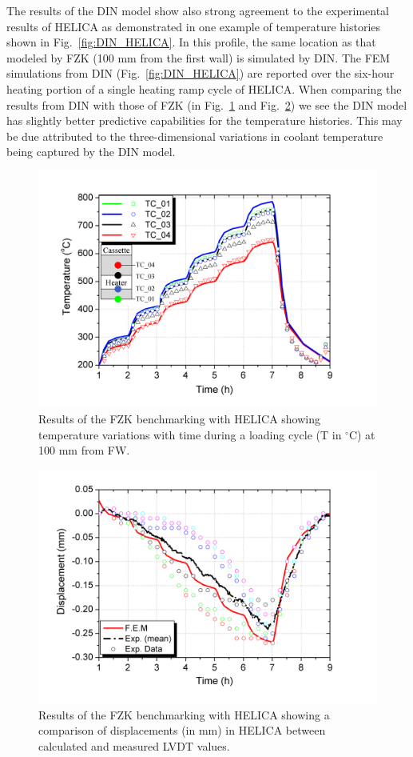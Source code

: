 The results of the DIN model show also strong agreement to the experimental results of HELICA as demonstrated in one example of temperature histories shown in Fig.~\ref{fig:DIN_HELICA}. In this profile, the same location as that modeled by FZK (100 mm from the first wall) is simulated by DIN. The FEM simulations from DIN (Fig.~\ref{fig:DIN_HELICA}) are reported over the six-hour heating portion of a single heating ramp cycle of HELICA. When comparing the results from DIN with those of FZK (in Fig.~\ref{fig:FZK_HELICAa} and Fig.~\ref{fig:FZK_HELICAb}) we see the DIN model has slightly better predictive capabilities for the temperature histories. This may be due attributed to the three-dimensional variations in coolant temperature being captured by the DIN model. 


\begin{figure}[t!]
\centering
\includegraphics[width=\singleimagewidth]{figures/Fig-6}
\caption{Results of the FZK benchmarking with HELICA\cite{Gan:2009vn} showing temperature variations with time during a loading cycle (T in $^\circ$C) at 100 mm from FW.}\label{fig:FZK_HELICAa}
\end{figure}

\begin{figure}[t!]
\centering
\includegraphics[width=\singleimagewidth]{figures/Fig-7}
\caption{Results of the FZK benchmarking with HELICA\cite{Gan:2009vn} showing a comparison of displacements (in mm) in HELICA between calculated and measured LVDT values.}
\label{fig:FZK_HELICAb}
\end{figure}

